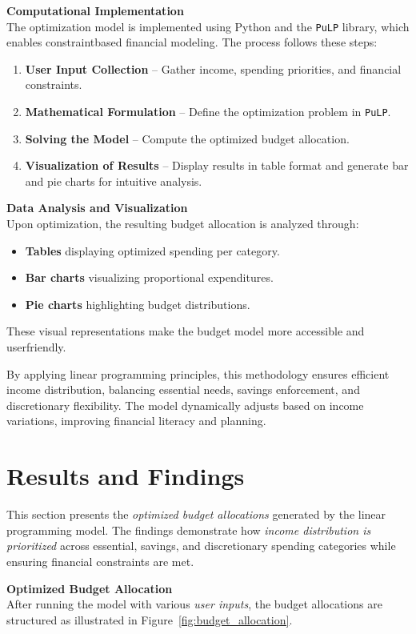\documentclass{article}
\begin{document}
\textbf{Computational Implementation} \\
The optimization model is implemented using Python and the \texttt{PuLP} library, which enables constraintbased financial modeling. The process follows these steps:
\begin{enumerate}
    \item \textbf{User Input Collection} – Gather income, spending priorities, and financial constraints.
    \item \textbf{Mathematical Formulation} – Define the optimization problem in \texttt{PuLP}.
    \item \textbf{Solving the Model} – Compute the optimized budget allocation.
    \item \textbf{Visualization of Results} – Display results in table format and generate bar and pie charts for intuitive analysis.
\end{enumerate}

\textbf{Data Analysis and Visualization} \\
Upon optimization, the resulting budget allocation is analyzed through:
\begin{itemize}
    \item \textbf{Tables} displaying optimized spending per category.
    \item \textbf{Bar charts} visualizing proportional expenditures.
    \item \textbf{Pie charts} highlighting budget distributions.
\end{itemize}
These visual representations make the budget model more accessible and userfriendly.

By applying linear programming principles, this methodology ensures efficient income distribution, balancing essential needs, savings enforcement, and discretionary flexibility. The model dynamically adjusts based on income variations, improving financial literacy and planning.

\section{Results and Findings}
This section presents the \textit{optimized budget allocations} generated by the linear programming model. The findings demonstrate how \textit{income distribution is prioritized} across essential, savings, and discretionary spending categories while ensuring financial constraints are met.

\textbf{Optimized Budget Allocation} \\
After running the model with various \textit{user inputs}, the budget allocations are structured as illustrated in Figure~\ref{fig:budget_allocation}.
\end{document}
